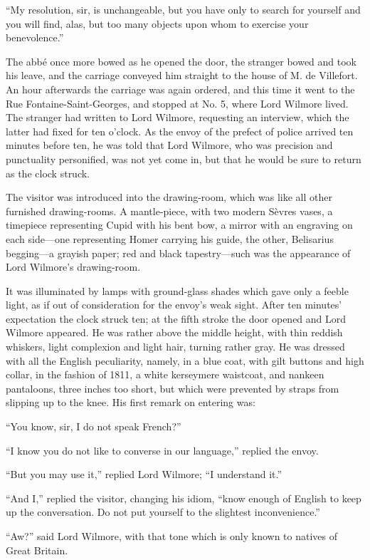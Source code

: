“My resolution, sir, is unchangeable, but you have only to search for
yourself and you will find, alas, but too many objects upon whom to
exercise your benevolence.”

The abbé once more bowed as he opened the door, the stranger bowed and
took his leave, and the carriage conveyed him straight to the house of
M. de Villefort. An hour afterwards the carriage was again ordered, and
this time it went to the Rue Fontaine-Saint-Georges, and stopped at No.
5, where Lord Wilmore lived. The stranger had written to Lord Wilmore,
requesting an interview, which the latter had fixed for ten o’clock. As
the envoy of the prefect of police arrived ten minutes before ten, he
was told that Lord Wilmore, who was precision and punctuality
personified, was not yet come in, but that he would be sure to return
as the clock struck.

The visitor was introduced into the drawing-room, which was like all
other furnished drawing-rooms. A mantle-piece, with two modern Sèvres
vases, a timepiece representing Cupid with his bent bow, a mirror with
an engraving on each side—one representing Homer carrying his guide,
the other, Belisarius begging—a grayish paper; red and black
tapestry—such was the appearance of Lord Wilmore’s drawing-room.

It was illuminated by lamps with ground-glass shades which gave only a
feeble light, as if out of consideration for the envoy’s weak sight.
After ten minutes’ expectation the clock struck ten; at the fifth
stroke the door opened and Lord Wilmore appeared. He was rather above
the middle height, with thin reddish whiskers, light complexion and
light hair, turning rather gray. He was dressed with all the English
peculiarity, namely, in a blue coat, with gilt buttons and high collar,
in the fashion of 1811, a white kerseymere waistcoat, and nankeen
pantaloons, three inches too short, but which were prevented by straps
from slipping up to the knee. His first remark on entering was:

“You know, sir, I do not speak French?”

“I know you do not like to converse in our language,” replied the
envoy.

“But you may use it,” replied Lord Wilmore; “I understand it.”

“And I,” replied the visitor, changing his idiom, “know enough of
English to keep up the conversation. Do not put yourself to the
slightest inconvenience.”

“Aw?” said Lord Wilmore, with that tone which is only known to natives
of Great Britain.


